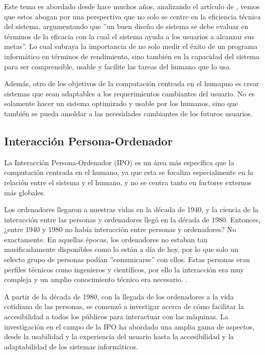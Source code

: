 Este tema es abordado desde hace muchos años, analizando el artículo de \cite{Card1983ThePO}, vemos que estos abogan por una perspectiva que no solo se centre en la eficiencia técnica del sistema, argumentando que ''un buen diseño de sistema se debe evaluar en términos de la eficacia con la cual el sistema ayuda a los usuarios a alcanzar sus metas''. Lo cual subraya la importancia de no solo medir el éxito de un programa informático en términos de rendimiento, sino también en la capacidad del sistema para ser comprensible, usable y facilite las tareas del humano que lo usa.

Además, otro de los objetivos de la computación centrada en el humapno es crear sistemas que sean adaptables a los requerimientos cambiantes del usuario. No es solamente hacer un sistema optimizado y usable por los humanos, sino que también se pueda amoldar a las necesidades cambiantes de los futuros usuarios.

\subsection{Interacción Persona-Ordenador }

La Interacción Persona-Ordenador (IPO) es un área más específica que la computación centrada en el humano, ya que esta se focaliza especialmente en la relación entre el sistema y el humano, y no se centra tanto en factores externos más globales.

Los ordenadores llegaron a nuestras vidas en la década de 1940, y la ciencia de la interacción entre las personas y ordenadores llegó en la década de 1980. Entonces, ¿entre 1940 y 1980 no había interacción entre personas y ordenadores? No exactamente. En aquellas épocas, los ordenadores no estaban tan masificadamente disponibles como lo están a día de hoy, por lo que solo un selecto grupo de personas podían ''comunicarse'' con ellos. Estas personas eran perfiles técnicos como ingenieros y científicos, por ello la interacción era muy compleja y un amplio conocimiento técnico era necesario. \citep{mackenzie2012human}.

A partir de la década de 1980, con la llegada de los ordenadores a la vida cotidiana de las personas, se comenzó a investigar acerca de cómo facilitar la accesibilidad a todos los públicos para interactuar con las máquinas.  La investigación en el campo de la IPO ha abordado una amplia gama de aspectos, desde la usabilidad y la experiencia del usuario hasta la accesibilidad y la adaptabilidad de los sistemas informáticos.

